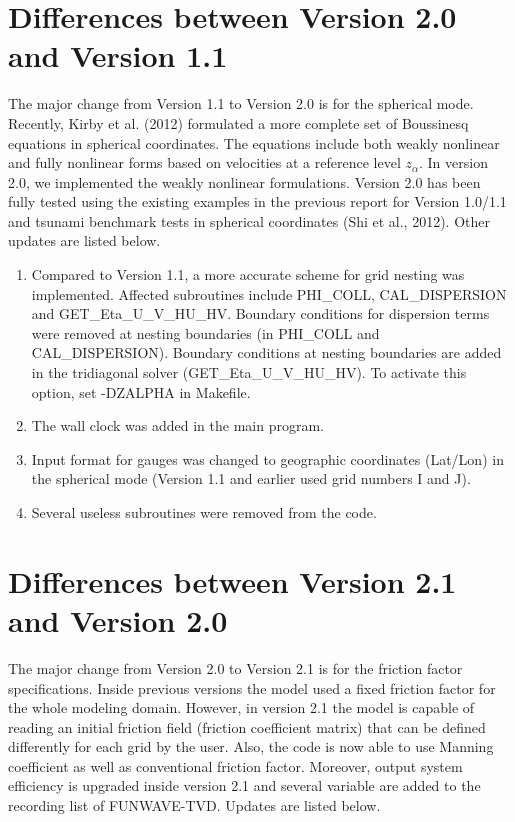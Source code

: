\documentclass[11pt]{article}
\begin{document}
\section*{Differences between Version 2.0 and Version 1.1}

The major change from Version 1.1 to Version 2.0 is for the spherical mode. Recently, Kirby et al. (2012) formulated a more complete set of Boussinesq equations in spherical coordinates. The equations include both weakly nonlinear and fully nonlinear forms based on velocities at a reference level $z_\alpha$. In version 2.0, we implemented the weakly nonlinear formulations. Version 2.0 has been fully tested using the existing examples in the previous report for Version 1.0/1.1 and tsunami benchmark tests in spherical coordinates (Shi et al., 2012). Other updates are listed below.

\begin{enumerate}

\item Compared to Version 1.1, a more accurate scheme for grid nesting was implemented. Affected subroutines include PHI\_COLL, CAL\_DISPERSION and GET\_Eta\_U\_V\_HU\_HV.  Boundary conditions for dispersion terms were removed at nesting boundaries (in PHI\_COLL and CAL\_DISPERSION). Boundary conditions at nesting boundaries are added in the tridiagonal solver (GET\_Eta\_U\_V\_HU\_HV). To activate this option, set -DZALPHA in Makefile.

\item The wall clock was added in the main program.

\item Input format for gauges was changed to geographic coordinates (Lat/Lon) in the spherical mode (Version 1.1 and earlier used grid numbers I and J).

\item Several useless subroutines were removed from the code. 

\end{enumerate}

\section*{Differences between Version 2.1 and Version 2.0}

The major change from Version 2.0 to Version 2.1 is for the friction factor specifications. Inside previous versions the model used a fixed friction factor for the whole modeling domain. However, in version 2.1 the model is capable of reading an initial friction field (friction coefficient matrix) that can be defined differently for each grid by the user. Also, the code is now able to use Manning coefficient as well as conventional friction factor. Moreover, output system efficiency is upgraded inside version 2.1 and several variable are added to the recording list of FUNWAVE-TVD. Updates are listed below.
\end{document}
